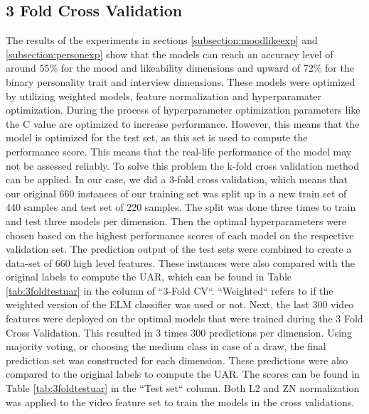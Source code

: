 \subsection{3 Fold Cross Validation}\label{subsection:3foldcv}
The results of the experiments in sections \ref{subsection:moodlikeexp} and \ref{subsection:personexp} show that the models can reach an accuracy level of around 55\% for the mood and likeability dimensions and upward of 72\% for the binary personality trait and interview dimensions. These models were optimized by utilizing weighted models, feature normalization and hyperparamater optimization. During the process of hyperparameter optimization parameters like the C value are optimized to increase performance. However, this means that the model is optimized for the test set, as this set is used to compute the performance score. This means that the real-life performance of the model may not be assessed reliably. To solve this problem the k-fold cross validation method can be applied. In our case, we did a 3-fold cross validation, which means that our original 660 instances of our training set was split up in a new train set of 440 samples and test set of 220 samples. The split was done three times to train and test three models per dimension. Then the optimal hyperparameters were chosen based on the highest performance scores of each model on the respective validation set. The prediction output of the test sets were combined to create a data-set of 660 high level features. These instances were also compared with the original labels to compute the UAR, which can be found in Table \ref{tab:3foldtestuar} in the column of ``3-Fold CV``. ``Weighted`` refers to if the weighted version of the ELM classifier was used or not. Next, the last 300 video features were deployed on the optimal models that were trained during the 3 Fold Cross Validation. This resulted in 3 times 300 predictions per dimension. Using majority voting, or choosing the medium class in case of a draw, the final prediction set was constructed for each dimension. These predictions were also compared to the original labels to compute the UAR. The scores can be found in Table \ref{tab:3foldtestuar} in the ``Test set`` column. Both L2 and ZN normalization was applied to the video feature set to train the models in the cross validations. 



